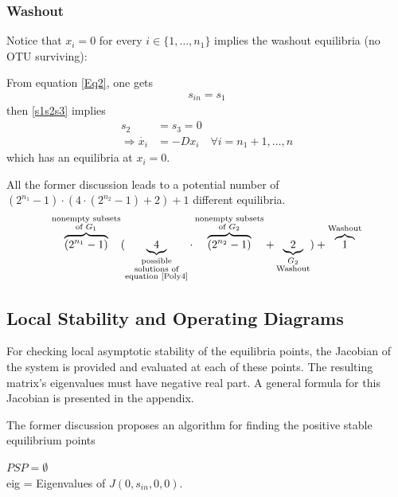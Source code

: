 \documentclass[3p,times]{elsarticle}
\newcommand{\N}{\mathbb{N}}
\newcommand{\R}{\mathbb{R}}
\begin{document}
\subsubsection{Washout}	
Notice that $x_i = 0$ for every $i \in \{1,\dots, n_1\}$ implies the washout equilibria (no OTU surviving):

From equation \eqref{Eq2}, one gets 
\begin{align*} s_{in} = s_1 \end{align*}
then \eqref{s1s2s3} implies \begin{align*}s_2 &= s_3 = 0 \\ \Rightarrow \dot{x_i} &= -Dx_i \quad \forall i = n_1+1, \dots, n\end{align*}   
which has an equilibria at $x_i = 0$. 

All the former discussion leads to a potential number of   $ (2^{n_1}-1)\cdot (4\cdot(2^{n_2}-1)+2)+1 $  different equilibria. 
\begin{align} \overbrace{(2^{n_1}-1)}^{\substack{\text{nonempty subsets} \\ \text{of }G_1 }} (\underbrace{4}_{\substack{\text{possible} \\ \text{solutions of} \\ \text{equation \eqref{Poly4}}}} \cdot\overbrace{(2^{n_2}-1)}^{\substack{\text{nonempty subsets} \\ \text{of  }G_2}}+\underbrace{2}_{\substack{G_2 \\ \text{Washout}}})+\overbrace{1}^\text{Washout} 
\end{align}

\subsection{Local Stability and Operating Diagrams}
For checking local asymptotic stability of the equilibria points, the Jacobian of the system is provided and evaluated at each of these points. The resulting matrix's eigenvalues must have negative real part. A general formula for this Jacobian is presented in the appendix.

The former discussion proposes an algorithm for finding the positive stable equilibrium points 

\begin{algorithm}[H]
	\KwData{$A \in M_{n\times n}(\R)$, $D, s_{in}, \bar{\mu}_i,K_i, k_i,  \in \R \, i\in [n], $, $n_1, n_2 \in \N$}
	$PSP = \emptyset$ \\
	eig = Eigenvalues of $J(0,s_{in},0,0)$. \\
	\label{StabilityAnalysis}
\end{algorithm}
\end{document}
